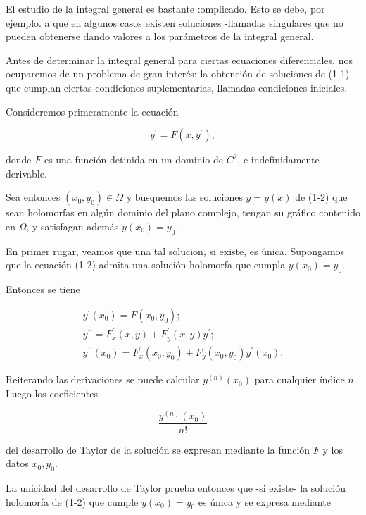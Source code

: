 \documentclass[10pt]{article}
\theoremstyle{plain}
\theoremstyle{definition}
\theoremstyle{remark}
\begin{document}
El estudio de la integral general es bastante :omplicado. Esto se debe, por ejemplo. a que en algunos casos existen soluciones -llamadas singulares que no pueden obtenerse dando valores a los parámetros de la integral general.

Antes de determinar la integral general para ciertas ecuaciones diferenciales, nos ocuparemos de un problema de gran interés: la obtención de soluciones de (1-1) que cumplan ciertas condiciones suplementarias, llamadas condiciones iniciales.

Consideremos primeramente la ecuación


\begin{equation*}
y^{\prime}=F\left(x, y^{\prime}\right), \tag{1-2}
\end{equation*}


donde $F$ es una función detinida en un dominio de $C^{2}$, e indefinidamente derivable.

Sea entonces $\left(x_{0}, y_{0}\right) \in \Omega$ y busquemos las soluciones $y=y(x)$ de (1-2) que sean holomorfas en algún dominio del plano complejo, tengan su gráfico contenido en $\Omega$, y satisfagan además $y\left(x_{0}\right)=y_{0}$.

En primer rugar, veamos que una tal solucion, si existe, es única. Supongamos que la ecuación (1-2) admita una solución holomorfa que cumpla $y\left(x_{0}\right)=y_{0}$.

Entonces se tiene

$$
\begin{gathered}
y^{\prime}\left(x_{0}\right)=F\left(x_{0}, y_{0}\right) ; \\
y^{\prime \prime}=F_{x}^{\prime}(x, y)+F_{y}^{\prime}(x, y) y^{\prime} ; \\
y^{\prime \prime}\left(x_{0}\right)=F_{x}^{\prime}\left(x_{0}, y_{0}\right)+F_{y}^{\prime}\left(x_{0}, y_{0}\right) y^{\prime}\left(x_{0}\right) .
\end{gathered}
$$

Reiterando las derivaciones se puede calcular $y^{(n)}\left(x_{0}\right)$ para cualquier índice $n$. Luego los coeficientes

$$
\frac{y^{(n)}\left(x_{0}\right)}{n!}
$$

del desarrollo de Taylor de la solución se expresan mediante la función $F$ y los datos $x_{0}, y_{0}$.

La unicidad del desarrollo de Taylor prueba entonces que -si existe- la solución holomorfa de (1-2) que cumple $y\left(x_{0}\right)=y_{0}$ es única y se expresa mediante
\end{document}
